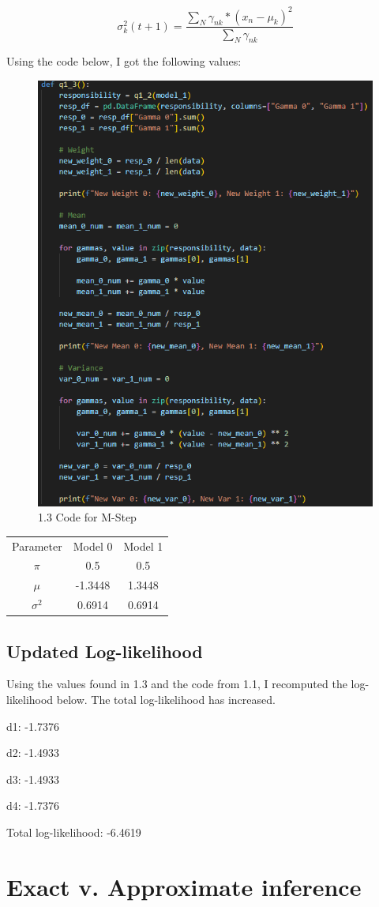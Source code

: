 \documentclass{article}
\begin{document}
\[\sigma_k^2(t+1) = \frac{\sum_N \gamma_{nk} * (x_n - \mu_k)^2 }{\sum_N \gamma_{nk}} \]

Using the code below, I got the following values:
\begin{figure}
    \centering
    \includegraphics[width=0.5\linewidth]{Q1.3 Code.png}
    \caption{1.3 Code for M-Step}
\end{figure}

\begin{center}
\begin{tabular}{ c c c }
 Parameter & Model 0 & Model 1 \\
 $\pi$      & 0.5 & 0.5 \\ 
 $\mu$      & -1.3448 & 1.3448 \\  
 $\sigma^2$ & 0.6914 & 0.6914 \\
\end{tabular}
\end{center}

\subsection{Updated Log-likelihood}
Using the values found in 1.3 and the code from 1.1, I recomputed the log-likelihood below. The total log-likelihood has increased.

d1: -1.7376 

d2: -1.4933 

d3: -1.4933 

d4: -1.7376 

Total log-likelihood: -6.4619

\section{Exact v. Approximate inference}
\end{document}

